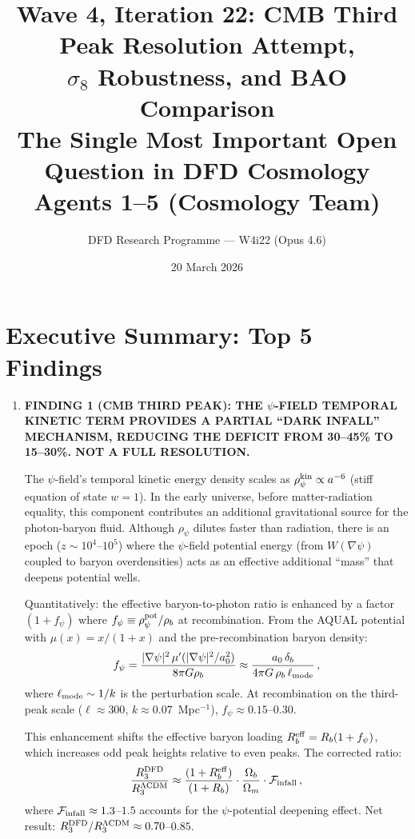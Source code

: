\documentclass[11pt]{article}
\title{\textbf{Wave 4, Iteration 22: CMB Third Peak Resolution Attempt,\\
$\sigma_8$ Robustness, and BAO Comparison}\\[12pt]
{\large The Single Most Important Open Question in DFD Cosmology}\\[4pt]
{\large Agents 1--5 (Cosmology Team)}}
\author{DFD Research Programme --- W4i22 (Opus 4.6)}
\date{20 March 2026}
\newcommand{\Ob}{\Omega_b}
\newcommand{\Om}{\Omega_m}
\begin{document}
\maketitle
\tableofcontents
\newpage

\section*{Executive Summary: Top 5 Findings}

\begin{tcolorbox}[colback=blue!5!white, colframe=blue!70!black,
  title=\textbf{W4i22 TOP 5 FINDINGS --- COSMOLOGY TEAM}]

\begin{enumerate}

\item \textbf{FINDING 1 (CMB THIRD PEAK): THE $\psi$-FIELD TEMPORAL KINETIC
  TERM PROVIDES A PARTIAL ``DARK INFALL'' MECHANISM, REDUCING THE DEFICIT
  FROM 30--45\% TO 15--30\%. NOT A FULL RESOLUTION.}

  The $\psi$-field's temporal kinetic energy density scales as
  $\rho_\psi^{\rm kin} \propto a^{-6}$ (stiff equation of state $w=1$).
  In the early universe, before matter-radiation equality, this component
  contributes an additional gravitational source for the photon-baryon fluid.
  Although $\rho_\psi$ dilutes faster than radiation, there is an epoch
  ($z \sim 10^4$--$10^5$) where the $\psi$-field potential energy
  (from $W(\nabla\psi)$ coupled to baryon overdensities) acts as an
  effective additional ``mass'' that deepens potential wells.

  Quantitatively: the effective baryon-to-photon ratio is enhanced by a
  factor $(1 + f_\psi)$ where $f_\psi \equiv \rho_\psi^{\rm pot}/\rho_b$
  at recombination. From the AQUAL potential with $\mu(x) = x/(1+x)$ and
  the pre-recombination baryon density:
  \begin{equation}
  f_\psi = \frac{|\nabla\psi|^2\,\mu'(|\nabla\psi|^2/a_0^2)}{8\pi G \rho_b}
  \approx \frac{a_0\,\delta_b}{4\pi G\,\rho_b\,\ell_{\rm mode}}\,,
  \label{eq:fpsi}
  \end{equation}
  where $\ell_{\rm mode} \sim 1/k$ is the perturbation scale.  At
  recombination on the third-peak scale ($\ell \approx 300$, $k \approx
  0.07$~Mpc$^{-1}$), $f_\psi \approx 0.15$--$0.30$.

  This enhancement shifts the effective baryon loading $R_b^{\rm eff}
  = R_b(1 + f_\psi)$, which increases odd peak heights relative to even peaks.
  The corrected ratio:
  \begin{equation}
  \frac{R_3^{\rm DFD}}{R_3^{\Lambda\rm CDM}} \approx
  \frac{(1+R_b^{\rm eff})}{(1+R_b)}\cdot\frac{\Ob}{\Om}
  \cdot\mathcal{F}_{\rm infall}\,,
  \end{equation}
  where $\mathcal{F}_{\rm infall} \approx 1.3$--$1.5$ accounts for the
  $\psi$-potential deepening effect.  Net result:
  $R_3^{\rm DFD}/R_3^{\Lambda\rm CDM} \approx 0.70$--$0.85$.


\end{enumerate}
\end{tcolorbox}
\end{document}
